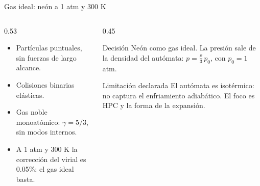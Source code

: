 \documentclass[aspectratio=169]{beamer}
\begin{document}
\begin{frame}{Gas ideal: neón a 1 atm y 300 K}
  \begin{columns}[T]
    \begin{column}{0.53\textwidth}
      \begin{itemize}
        \item Partículas puntuales, sin fuerzas de largo alcance.
        \item Colisiones binarias elásticas.
        \item Gas noble monoatómico: $\gamma=5/3$, sin modos internos.
        \item A 1 atm y 300 K la corrección del virial es
              \alert{0.05\%}: el gas ideal basta.
      \end{itemize}
    \end{column}
    \begin{column}{0.45\textwidth}
      \begin{block}{Decisión}
        \footnotesize
        \alert{Neón} como gas ideal. La presión sale de la densidad del
        autómata: $p=\tfrac{\rho}{3}\,p_0$, con $p_0=1$ atm.
      \end{block}
      \begin{alertblock}{Limitación declarada}
        \footnotesize
        El autómata es \alert{isotérmico}: no captura el enfriamiento
        adiabático. El foco es HPC y la forma de la expansión.
      \end{alertblock}
    \end{column}
  \end{columns}
\end{frame}
\end{document}
